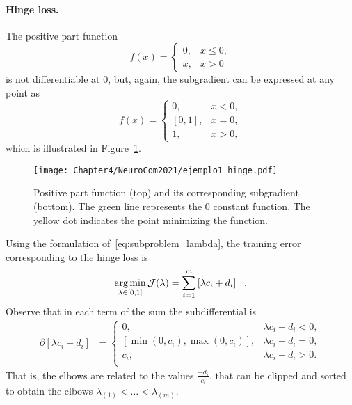 \paragraph*{Hinge loss.\\}
The positive part function 
\begin{equation}
    \nonumber
    f(x) = 
    \begin{cases}
    0 ,& x \leq 0, \\
    x ,& x > 0    
    \end{cases}
\end{equation}
is not differentiable at $0$, but, again, the subgradient can be expressed at any point as
\begin{equation}
    \nonumber
    f(x) = 
    \begin{cases}
    0 ,& x < 0, \\
    [0, 1] ,& x = 0 , \\
    1 ,& x > 0 ,
    \end{cases}
\end{equation}
which is illustrated in Figure~\ref{fig:hinge_loss}.
\begin{figure}[t!]
    \centering
    \texttt{[image: Chapter4/NeuroCom2021/ejemplo1\_hinge.pdf]}
    \caption{Positive part function (top) and its corresponding subgradient (bottom). The green line represents the $0$ constant function. The yellow dot indicates the point minimizing the function.}
    \label{fig:hinge_loss}
\end{figure}
Using the formulation of~\eqref{eq:subproblem_lambda}, the training error corresponding to the hinge loss is
\begin{equation}
    \label{eq:opt_hinge_l1}
    \argmin_{\lambda \in [0, 1]} \mathcal{J}(\lambda) = \sum_{i=1}^{\npertask} \pospart{\lambda c_i + d_i}.
\end{equation}
Observe that in each term of the sum the subdifferential is 
\begin{align*}
    \partial \left[\lambda c_i + d_i \right]_+ = 
    \begin{cases}
        0 ,& \lambda c_i + d_i  < 0, \\
        [\min(0, c_i), \max(0, c_i)] ,& \lambda c_i + d_i  = 0, \\
        c_i ,& \lambda c_i + d_i  > 0. \\
    \end{cases}
\end{align*}
That is, the elbows are related to the values $\frac{-d_i}{c_i}$, that can be clipped and sorted to obtain the elbows ${\lambda}_{(1)} < \ldots < {\lambda}_{(m)}$.
